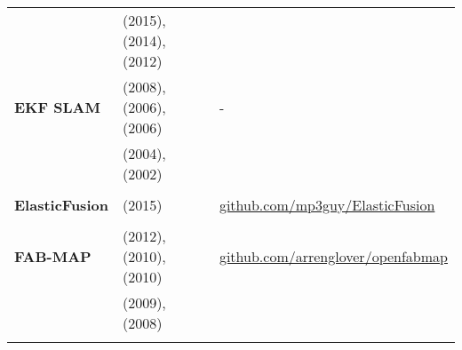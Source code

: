 \documentclass[a4paper,12pt]{scrartcl}
\begin{document}
{\begin{longtable}{l|l|l}
                           & \cite{Samsuri2015} (2015), \cite{Sola2014} (2014), \cite{Kurt-Yavuz2012} (2012)             &                                                                                                                              \\
    \textbf{EKF SLAM}      & \cite{Paz2008} (2008), \cite{Bailey2006} (2006), \cite{Bailey2006a} (2006)                  & -                                                                                                                            \\
                           & \cite{Riisgaard2004} (2004), \cite{Thrun1999} (2002)                                        &                                                                                                                              \\
                           &                                                                                             &                                                                                                                              \\ [-3mm]
    \textbf{ElasticFusion} & \cite{Whelan2015} (2015)                                                                    & {\href{https://github.com/mp3guy/ElasticFusion}{github.com/mp3guy/ElasticFusion}}                                            \\
                           &                                                                                             &                                                                                                                              \\ [-3mm]
    \textbf{FAB-MAP}       & \cite{Glover2012} (2012), \cite{Glover2010} (2010), \cite{Paul2010} (2010)                  & {\href{https://github.com/arrenglover/openfabmap}{github.com/arrenglover/openfabmap}}                                        \\
                           & \cite{Cummins2009} (2009), \cite{Cummins2008} (2008)                                        &                                                                                                                              \\
                           &                                                                                             &                                                                                                                              \\ [-3mm]

\end{longtable}}
\end{document}
